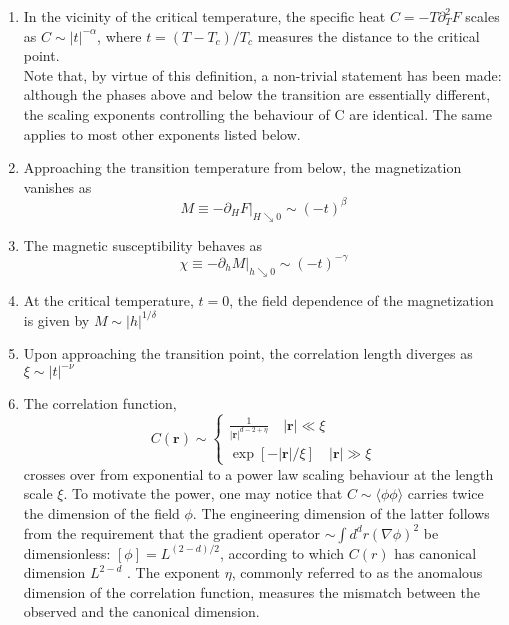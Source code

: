 \begin{enumerate}
\item In the vicinity of the critical temperature, the specific heat $C = -T\partial_T^2 F$ scales as $C \sim |t|^{-\alpha}$, where $t = (T-T_c)/T_c$ measures the distance to the critical point. 
\\
Note that, by virtue of this definition, a non-trivial statement has been made: although the phases above and below the transition are essentially different, the scaling exponents controlling the behaviour of C are identical. The same applies to most other exponents listed below.
\item Approaching
the transition temperature from below, the magnetization vanishes as
\[M \equiv -\left. \partial_H F \right|_{H \searrow 0} \sim (-t)^{\beta} \]
\item The magnetic susceptibility behaves as
\[\chi \equiv -\left. \partial_h M \right|_{h \searrow 0} \sim (-t)^{-\gamma} \]
\item At the critical temperature, $t = 0$, the field dependence of the magnetization is given by $M \sim |h|^{1/\delta}$
\item Upon approaching the transition point, the correlation length diverges as $\xi \sim |t|^{-\nu}$
\item The correlation function,
\[C(\bm{r}) \sim \begin{cases} \frac{1}{|\bm{r}|^{d-2+\eta}} \quad |\bm{r}| \ll \xi \\ \exp[-|\bm{r}|/\xi] \quad |\bm{r}| \gg \xi  \end{cases} \]
crosses over from exponential to a power law scaling behaviour at the length scale $\xi$. 
To motivate the power, one may notice that $C \sim \langle \phi \phi \rangle$ carries twice the dimension of the field $\phi$. 
The engineering dimension of the latter follows from the requirement that the gradient operator $\sim \int d^dr (\nabla \phi)^2$ be dimensionless: $[\phi] = L^{(2-d)/2}$, according to which $C(r)$ has canonical dimension $L^{2-d}$ . 
The exponent $\eta$, commonly referred to as the anomalous dimension of the correlation function, measures the mismatch between the observed and the canonical dimension.
\end{enumerate}

